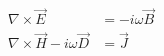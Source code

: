\begin{equation}
\begin{split}
    \nabla \times \vec{E} &= -i \omega\vec{B} \\
    \nabla \times \vec{H} - i \omega\vec{D} &= \vec{J}
\end{split}
\label{eq:maxwell_freq_full}
\end{equation}
